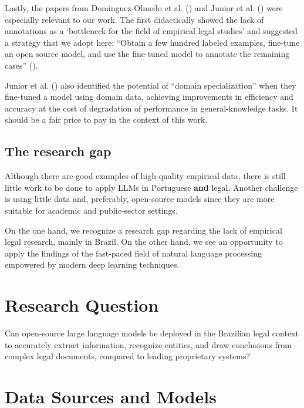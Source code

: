 \documentclass[
  12pt,
]{article}
\begin{document}
Lastly, the papers from Dominguez-Olmedo et al.
() and Junior et al.
() were especially relevant to our
work. The first didactically showed the lack of annotations as a
`bottleneck for the field of empirical legal studies' and suggested a
strategy that we adopt here: ``Obtain a few hundred labeled examples,
fine-tune an open source model, and use the fine-tuned model to annotate
the remaining cases''
().

Junior et al. () also identified
the potential of ``domain specialization'' when they fine-tuned a model
using domain data, achieving improvements in efficiency and accuracy at
the cost of degradation of performance in general-knowledge tasks. It
should be a fair price to pay in the context of this work.

\subsection{The research gap}\label{the-research-gap}

Although there are good examples of high-quality empirical data, there
is still little work to be done to apply LLMs in Portuguese \textbf{and}
legal. Another challenge is using little data and, preferably,
open-source models since they are more suitable for academic and
public-sector settings.

On the one hand, we recognize a research gap regarding the lack of
empirical legal research, mainly in Brazil. On the other hand, we see an
opportunity to apply the findings of the fast-paced field of natural
language processing empowered by modern deep learning techniques.

\section{Research Question}\label{sec-research_question}

Can open-source large language models be deployed in the Brazilian legal
context to accurately extract information, recognize entities, and draw
conclusions from complex legal documents, compared to leading
proprietary systems?

\section{Data Sources and Models}\label{sec-data_sources_models}
\end{document}
